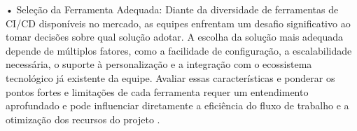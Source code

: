 • Seleção da Ferramenta Adequada: Diante da diversidade de ferramentas de CI/CD disponíveis no mercado, as equipes enfrentam um desafio significativo ao tomar decisões sobre qual solução adotar. A escolha da solução mais adequada depende de múltiplos fatores, como a facilidade de configuração, a escalabilidade necessária, o suporte à personalização e a integração com o ecossistema tecnológico já existente da equipe. Avaliar essas características e ponderar os pontos fortes e limitações de cada ferramenta requer um entendimento aprofundado e pode influenciar diretamente a eficiência do fluxo de trabalho e a otimização dos recursos do projeto \cite{GitlabHowToChoose}.

